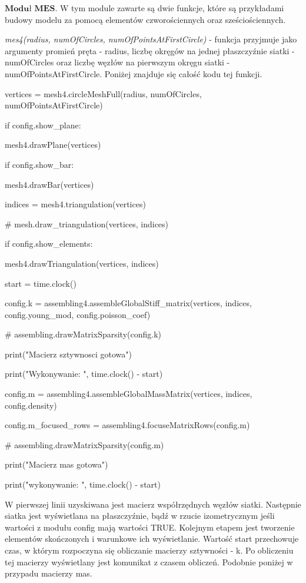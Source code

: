 \vspace {3mm}

 \( \textbf{Moduł MES} \).
W tym module zawarte są dwie funkcje, które są przykładami budowy modelu za pomocą elementów czworościennych oraz sześciościennych.

\textit{mes4(radius, numOfCircles, numOfPointsAtFirstCircle)} - funkcja przyjmuje jako argumenty promień pręta - radius, liczbę okręgów na jednej płaszczyźnie siatki - numOfCircles oraz liczbę węzłów na pierwszym okręgu siatki - numOfPointsAtFirstCircle. Poniżej znajduje się całość kodu tej funkcji.

\vspace {3mm}

    vertices = mesh4.circleMeshFull(radius, numOfCircles, numOfPointsAtFirstCircle)

    if config.show\_plane:

        mesh4.drawPlane(vertices)

    if config.show\_bar:

        mesh4.drawBar(vertices)

\vspace {3mm}
    indices = mesh4.triangulation(vertices)

    \# mesh.draw\_triangulation(vertices, indices)

    if config.show\_elements:

        mesh4.drawTriangulation(vertices, indices)

\vspace {3mm}
    start = time.clock()

    config.k = assembling4.assembleGlobalStiff\_matrix(vertices, indices, config.young\_mod, config.poisson\_coef)

    \# assembling.drawMatrixSparsity(config.k)

    print("Macierz sztywnosci gotowa")

    print("Wykonywanie: ", time.clock() - start)

\vspace {3mm}
    config.m = assembling4.assembleGlobalMassMatrix(vertices, indices, config.density)

    config.m\_focused\_rows = assembling4.focuseMatrixRows(config.m)

    \# assembling.drawMatrixSparsity(config.m)

    print("Macierz mas gotowa")

    print("wykonywanie: ", time.clock() - start)

\vspace {3mm}

W pierwszej linii uzyskiwana jest macierz współrzędnych węzłów siatki. Następnie siatka jest wyświetlana na płaszczyźnie, bądź w rzucie izometrycznym jeśli wartości z modułu config mają wartości TRUE. Kolejnym etapem jest tworzenie elementów skończonych i warunkowe ich wyświetlanie. Wartość start przechowuje czas, w którym rozpoczyna się obliczanie macierzy sztywności - k. Po obliczeniu tej macierzy wyświetlany jest komunikat z czasem obliczeń.  Podobnie poniżej w przypadu macierzy mas.

